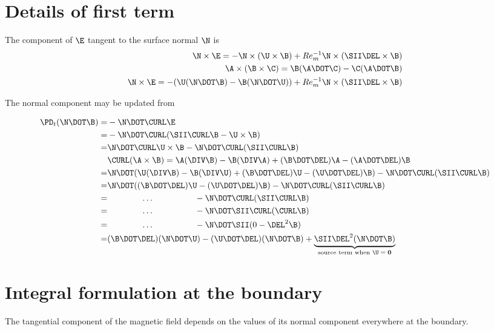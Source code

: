 \documentclass[11pt]{article}
\begin{document}
\section{Details of first term}
The component of $\E$ tangent to the surface normal $\N$ is
\begin{equation}\begin{aligned}
  \N \times \E = -\N \times (\U \times \B) + Re_m^{-1} \N \times (\SII \DEL \times \B) \\
  \A \times (\B \times \C) = \B (\A \DOT \C) - \C (\A \DOT \B) \\
  \N \times \E = -(\U (\N \DOT \B) - \B (\N \DOT \U)) + Re_m^{-1} \N \times (\SII \DEL \times \B) \\
\end{aligned}\end{equation}

The normal component may be updated from

\begin{equation}\begin{aligned}
  \PD_t (\N \DOT \B) =& - \N \DOT \CURL \E \\
   =& - \N \DOT \CURL (\SII \CURL \B - \U \times \B) \\
   =& \N \DOT \CURL \U \times \B - \N \DOT \CURL (\SII \CURL \B) \\
  & \CURL (\A \times \B) = \A (\DIV \B) - \B (\DIV \A) + (\B \DOT \DEL)\A - (\A \DOT \DEL)\B \\
   =& \N \DOT (\U (\DIV \B) - \B (\DIV \U) + (\B \DOT \DEL)\U - (\U \DOT \DEL)\B) - \N \DOT \CURL (\SII \CURL \B) \\
   =& \N \DOT ((\B \DOT \DEL)\U - (\U \DOT \DEL)\B) - \N \DOT \CURL (\SII \CURL \B) \\
   =& \qquad \qquad \hdots \qquad \qquad \quad  - \N \DOT \CURL (\SII \CURL \B) \\
   =& \qquad \qquad \hdots \qquad \qquad \quad  - \N \DOT \SII \CURL (\CURL \B) \\
   =& \qquad \qquad \hdots \qquad \qquad \quad  - \N \DOT \SII (0 - \DEL^2 \B) \\
   =& (\B \DOT \DEL)(\N \DOT \U) - (\U \DOT \DEL)(\N \DOT \B) + \underbrace{\SII \DEL^2 (\N \DOT \B)}_{\text{source term when $\U=\mathbf{0}$}} \\
\end{aligned}\end{equation}

\section{Integral formulation at the boundary}
The tangential component of the magnetic field depends on the values of its normal component everywhere at the boundary.
\end{document}
